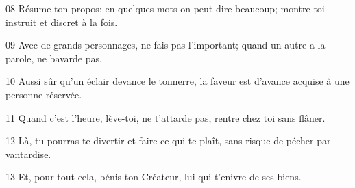 
08 Résume ton propos: en quelques mots on peut dire beaucoup; montre-toi instruit et discret à la fois.

09 Avec de grands personnages, ne fais pas l’important; quand un autre a la parole, ne bavarde pas.

10 Aussi sûr qu’un éclair devance le tonnerre, la faveur est d’avance acquise à une personne réservée.

11 Quand c’est l’heure, lève-toi, ne t’attarde pas, rentre chez toi sans flâner.

12 Là, tu pourras te divertir et faire ce qui te plaît, sans risque de pécher par vantardise.

13 Et, pour tout cela, bénis ton Créateur, lui qui t’enivre de ses biens.